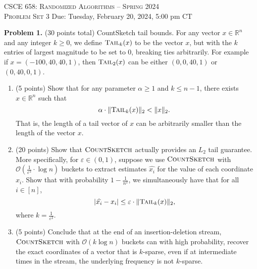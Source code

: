 \documentclass[11pt]{article}
\newcommand{\eps}{\varepsilon}
\newcommand{\tail}{\textsc{Tail}}
\newcommand{\CountSketch}{\textsc{CountSketch}}
\begin{document}
\begin{center}
{\Large\textsc{CSCE 658: Randomized Algorithms -- Spring 2024 \\ 
Problem Set 3}}
\vskip 0.1in
Due: Tuesday, February 20, 2024, 5:00 pm CT
\end{center}

\noindent
\textbf{Problem 1.} (30 points total)
CountSketch tail bounds. 
\vskip 0.1in\noindent
For any vector $x\in\mathbb{R}^n$ and any integer $k\ge 0$, we define $\tail_k(x)$ to be the vector $x$, but with the $k$ entries of largest magnitude to be set to $0$, breaking ties arbitrarily. 
For example if $x=(-100, 40, 40, 1)$, then $\tail_2(x)$ can be either $(0, 0, 40, 1)$ or $(0, 40, 0, 1)$.
\begin{enumerate}
\item (5 points)
Show that for any parameter $\alpha\ge 1$ and $k\le n-1$, there exists $x\in\mathbb{R}^n$ such that
\[\alpha\cdot\|\tail_k(x)\|_2<\|x\|_2.\]
That is, the length of a tail vector of $x$ can be arbitrarily smaller than the length of the vector $x$. 
\item (20 points)
Show that $\CountSketch$ actually provides an $L_2$ tail guarantee. 
More specifically, for $\eps\in(0,1)$, suppose we use $\CountSketch$ with $\mathcal{O}\left(\frac{1}{\eps^2}\cdot\log n\right)$ buckets to extract estimates $\widehat{x_i}$ for the value of each coordinate $x_i$. 
Show that with probability $1-\frac{1}{n^2}$, we simultaneously have that for all $i\in[n]$,
\[|\widehat{x_i}-x_i|\le\eps\cdot\|\tail_k(x)\|_2,\]
where $k=\frac{1}{\eps^2}$. 
\item (5 points)
Conclude that at the end of an insertion-deletion stream, $\CountSketch$ with $\mathcal{O}(k\log n)$ buckets can with high probability, recover the exact coordinates of a vector that is $k$-sparse, even if at intermediate times in the stream, the underlying frequency is not $k$-sparse.
\end{enumerate}
\end{document}
